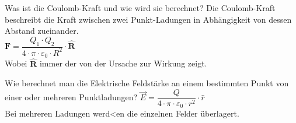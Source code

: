 \begin{lk}{Was ist die Coulomb-Kraft und wie wird sie berechnet?}
	Die Coulomb-Kraft beschreibt die Kraft zwischen zwei Punkt-Ladungen in Abhängigkeit von dessen Abstand zueinander.\\[12pt]
	\LARGE{ $ \bm{F} = \dfrac{Q_1 \cdot Q_2}{4 \cdot \pi \cdot \varepsilon_0 \cdot R^2} \cdot \bm{\hat{R}} $} \\[12pt]
	\normalsize Wobei $ \bm{\hat{R}} $ immer der von der Ursache zur Wirkung zeigt.
\end{lk}

\begin{lk}{Wie berechnet man die Elektrische Feldstärke an einem bestimmten Punkt von einer oder mehreren Punktladungen?}
	\LARGE{ $ \vec{E} = \dfrac{Q}{4 \cdot \pi \cdot \varepsilon_0 \cdot r^2} \cdot \hat{r} $} \\[12pt]
	\normalsize  Bei mehreren Ladungen werd<en die einzelnen Felder überlagert.
\end{lk}